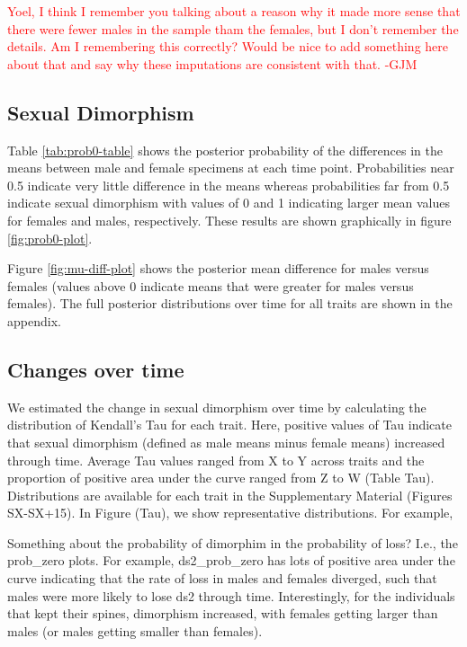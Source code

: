 \documentclass[
  12pt,
]{article}
\begin{document}
\textcolor{red}{Yoel, I think I remember you talking about a reason why it made more sense that there were fewer males in the sample tham the females, but I don't remember the details.  Am I remembering this correctly?  Would be nice to add something here about that and say why these imputations are consistent with that.  
-GJM}

\hypertarget{sexual-dimorphism}{%
\subsection{Sexual Dimorphism}\label{sexual-dimorphism}}

Table \ref{tab:prob0-table} shows the posterior probability of the
differences in the means between male and female specimens at each time
point. Probabilities near 0.5 indicate very little difference in the
means whereas probabilities far from 0.5 indicate sexual dimorphism with
values of 0 and 1 indicating larger mean values for females and males,
respectively. These results are shown graphically in figure
\ref{fig:prob0-plot}.

Figure \ref{fig:mu-diff-plot} shows the posterior mean difference for
males versus females (values above 0 indicate means that were greater
for males versus females). The full posterior distributions over time
for all traits are shown in the appendix.

\hypertarget{changes-over-time}{%
\subsection{Changes over time}\label{changes-over-time}}

We estimated the change in sexual dimorphism over time by calculating
the distribution of Kendall's Tau for each trait. Here, positive values
of Tau indicate that sexual dimorphism (defined as male means minus
female means) increased through time. Average Tau values ranged from X
to Y across traits and the proportion of positive area under the curve
ranged from Z to W (Table Tau). Distributions are available for each
trait in the Supplementary Material (Figures SX-SX+15). In Figure (Tau),
we show representative distributions. For example,

Something about the probability of dimorphim in the probability of loss?
I.e., the prob\_zero plots. For example, ds2\_prob\_zero has lots of
positive area under the curve indicating that the rate of loss in males
and females diverged, such that males were more likely to lose ds2
through time. Interestingly, for the individuals that kept their spines,
dimorphism increased, with females getting larger than males (or males
getting smaller than females).
\end{document}
